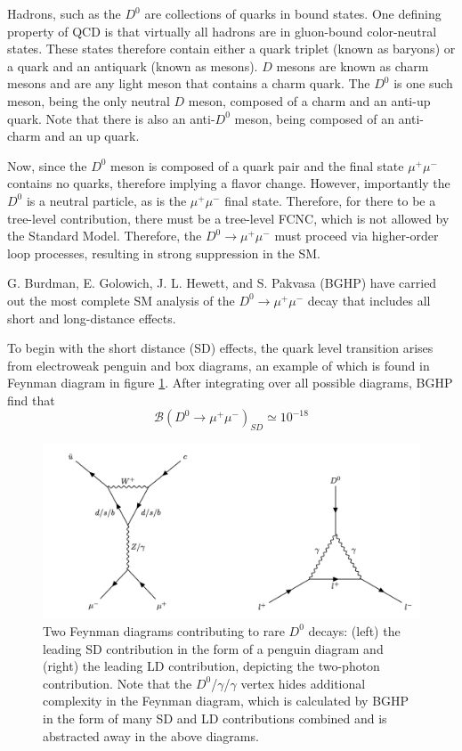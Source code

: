 Hadrons, such as the $D^0$ are collections of quarks in bound states. One defining property of QCD is that virtually all hadrons are in gluon-bound color-neutral states. These states therefore contain either a quark triplet (known as baryons) or a quark and an antiquark (known as mesons). $D$ mesons are known as charm mesons and are any light meson that contains a charm quark. The $D^0$ is one such meson, being the only neutral $D$ meson, composed of a charm and an anti-up quark. Note that there is also an anti-$D^0$ meson, being composed of an anti-charm and an up quark. 

Now, since the $D^0$ meson is composed of a quark pair and the final state $\mu^+ \mu^-$ contains no quarks, therefore implying a flavor change. However, importantly the $D^0$ is a neutral particle, as is the $\mu^+ \mu^-$ final state. Therefore, for there to be a tree-level contribution, there must be a tree-level FCNC, which is not allowed by the Standard Model. Therefore, the $D^0 \to \mu^+ \mu^-$  must proceed via higher-order loop processes, resulting in strong suppression in the SM.

G. Burdman, E. Golowich, J. L. Hewett, and S. Pakvasa (BGHP) have carried out the most complete SM analysis of the $D^0 \to \mu^+ \mu^-$ decay that includes all short and long-distance effects. 

To begin with the short distance (SD) effects, the quark level transition arises from electroweak penguin and box diagrams, an example of which is found in Feynman diagram in figure \ref{fig:D0_decay_diagrams}. After integrating over all possible diagrams, BGHP find that 
\begin{equation}
\mathcal{B}(D^0 \to \mu^+ \mu^-)_{SD} \simeq 10^{-18}
\end{equation}

\begin{figure}[ht!]
    \centering
    \includegraphics[width=1.0\textwidth]{figures/chapter2/d0_FCNC_decays.png}
    \caption{Two Feynman diagrams contributing to rare \(D^0\) decays: (left) the leading SD contribution in the form of a penguin diagram and (right) the leading LD contribution, depicting the two-photon contribution. Note that the $D^0$/$\gamma$/$\gamma$ vertex hides additional complexity in the Feynman diagram, which is calculated by BGHP in the form of many SD and LD contributions combined and is abstracted away in the above diagrams.}
  \label{fig:D0_decay_diagrams}
\end{figure}

